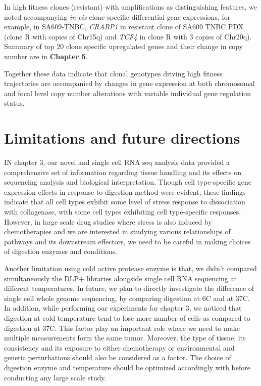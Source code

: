 In high fitness clones (resistant) with amplifications as distinguishing features, we noted accompanying \textit{in cis} clone-specific differential gene expressions, for example, in SA609-TNBC, \textit{CRABP1} in resistant clone of SA609 TNBC PDX (clone R with copies of Chr15q) and  \textit{TCF4} in clone R with 3 copies of Chr20q). Summary of top 20 clone specific upregulated genes and their change in copy number are in \textbf{Chapter 5}.

Together these data indicate that clonal genotypes driving high fitness trajectories are accompanied by changes in gene expression at both chromosomal and focal level copy number alterations with variable individual gene regulation status.


\section{Limitations and future directions}

IN chapter 3, our novel and single cell RNA seq analysis data provided a comprehensive set of information regarding tissue handling and its effects on sequencing analysis and biological interpretation. Though cell type-specific gene expression effects in response to digestion method were evident, these findings indicate that all cell types exhibit some level of stress response to dissociation with collagenase, with some cell types exhibiting cell type-specific responses. 
However, in large scale drug studies where stress is also induced by chemotherapies and we are interested in studying various relationships of pathways and its downstream effectors, we need to be careful in making choices of digestion enzymes and conditions. 

Another limitation using cold active protease enzyme is that, we didn't compared simultaneously the \ac{DLP+} libraries alongside single cell RNA sequencing at different temperatures. In future, we plan to directly investigate the difference of single cell whole genome sequencing, by comparing digestion at 6\textdegree C and at 37\textdegree C. In addition, while performing our experiments for chapter 3, we noticed that digestion at cold temperature tend to lose more number of cells as compared to digestion at 37\textdegree C. This factor play an important role where we need to make multiple measurements form the same tumor. Moreover, the type of tissue, its consistency and its exposure to either chemotherapy or environmental and genetic perturbations should also be considered as a factor. The choice of digestion enzyme and temperature should be optimized accordingly with before conducting any large scale study.

